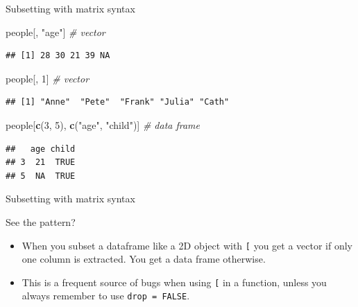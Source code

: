 \documentclass[ignorenonframetext,]{beamer}
\newenvironment{Shaded}{\begin{snugshade}}{\end{snugshade}}
\newcommand{\CommentTok}[1]{\textcolor[rgb]{0.56,0.35,0.01}{\textit{#1}}}
\newcommand{\DecValTok}[1]{\textcolor[rgb]{0.00,0.00,0.81}{#1}}
\newcommand{\KeywordTok}[1]{\textcolor[rgb]{0.13,0.29,0.53}{\textbf{#1}}}
\newcommand{\NormalTok}[1]{#1}
\newcommand{\StringTok}[1]{\textcolor[rgb]{0.31,0.60,0.02}{#1}}
\begin{document}
\begin{frame}[fragile]{Subsetting with matrix syntax}
\protect\hypertarget{subsetting-with-matrix-syntax-1}{}

\begin{Shaded}
\begin{Highlighting}[]
\NormalTok{people[, }\StringTok{"age"}\NormalTok{] }\CommentTok{# vector}
\end{Highlighting}
\end{Shaded}

\begin{verbatim}
## [1] 28 30 21 39 NA
\end{verbatim}

\begin{Shaded}
\begin{Highlighting}[]
\NormalTok{people[, }\DecValTok{1}\NormalTok{] }\CommentTok{#  vector}
\end{Highlighting}
\end{Shaded}

\begin{verbatim}
## [1] "Anne"  "Pete"  "Frank" "Julia" "Cath"
\end{verbatim}

\begin{Shaded}
\begin{Highlighting}[]
\NormalTok{people[}\KeywordTok{c}\NormalTok{(}\DecValTok{3}\NormalTok{, }\DecValTok{5}\NormalTok{), }\KeywordTok{c}\NormalTok{(}\StringTok{"age"}\NormalTok{, }\StringTok{"child"}\NormalTok{)] }\CommentTok{# data frame}
\end{Highlighting}
\end{Shaded}

\begin{verbatim}
##   age child
## 3  21  TRUE
## 5  NA  TRUE
\end{verbatim}

\end{frame}

\begin{frame}[fragile]{Subsetting with matrix syntax}
\protect\hypertarget{subsetting-with-matrix-syntax-2}{}

See the pattern?

\begin{itemize}
\item
  When you subset a dataframe like a 2D object with \texttt{{[}} you get
  a vector if only one column is extracted. You get a data frame
  otherwise.
\item
  This is a frequent source of bugs when using \texttt{{[}} in a
  function, unless you always remember to use \texttt{drop\ =\ FALSE}.
\end{itemize}

\end{frame}
\end{document}
